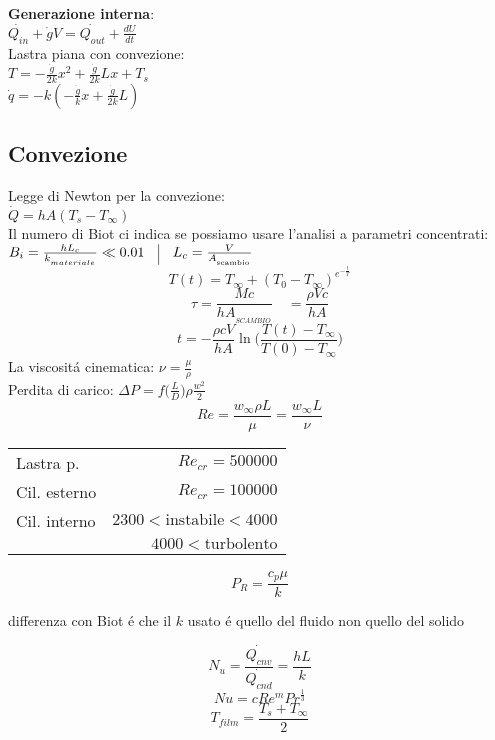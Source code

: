 \documentclass[landscape,a4paper]{article}
\begin{document}
\begin{multicols}{4}
\textbf{Generazione interna}: \\
\(\dot{Q_{in}} + \dot{g}V = \dot{Q_{out}} + \frac{dU}{dt} \) \\
Lastra piana con convezione: \\
\(T = -\frac{\dot g}{2k}x^2 + \frac{\dot g}{2k}Lx + T_s\) \\
\(\dot q = -k(-\frac{\dot g}{k}x+\frac{\dot g}{2k}L)\) 

\subsection*{Convezione}
Legge di Newton per la convezione:\\
\(\dot{Q} = h A (T_s - T_{\infty})\) \\
Il numero di Biot ci indica se possiamo usare l'analisi a parametri concentrati: \\
\( B_{i} = \frac {hL_{c}}{k_{_{materiale}}} \ll 0.01 \quad \vline \quad 
 L_{c} = \frac {V}{A_{_{\text{scambio}}}} \)
\[T(t) = T_{\infty} + {(T_0-T_\infty)}^{e^{- \frac{t}{T}} }\]
\[ \tau = \frac {Mc}{hA_{_{SCAMBIO}}} \quad   = \frac{\rho Vc}{hA} \]
\[t = -  \frac {\rho cV}{hA} \ln \bigg ( \frac {T(t)-T_{\infty}}{T(0)-T_{\infty}}  \bigg )\]
La viscositá cinematica: \(\nu = \frac {\mu}{\rho} \) \\
Perdita di carico: \(\Delta P = f\big(\frac{L}{D}\big)\rho \frac{w^2}{2}\) \\
\[ Re = \frac {w_{\infty} \rho L}{\mu}   = \frac{w_{\infty} L}{\nu} \]
\begin{tabular}{l r}
	Lastra p. & $Re_{cr} = 500000$ \\
	Cil. esterno & $Re_{cr} = 100000$ \\
	Cil. interno & $2300 < \text{instabile} < 4000$ \\
	 & $ 4000 < \text{turbolento}$
\end{tabular}

\[ P_{R} = \frac {c_p\mu}{k} \]
\begin{tiny}differenza con Biot é che il \(k\) usato é quello del fluido non quello del solido\end{tiny}
\[ N_{u} = \frac{\dot{Q_{cnv}}}{\dot{Q_{cnd}}} = \frac {hL}{k} \]
\[ Nu = cRe^{m} Pr^{\frac {1}{3}} \]
\[T_{film} = \frac{T_s + T_{\infty}}{2}\]


\end{multicols}
\end{document}
